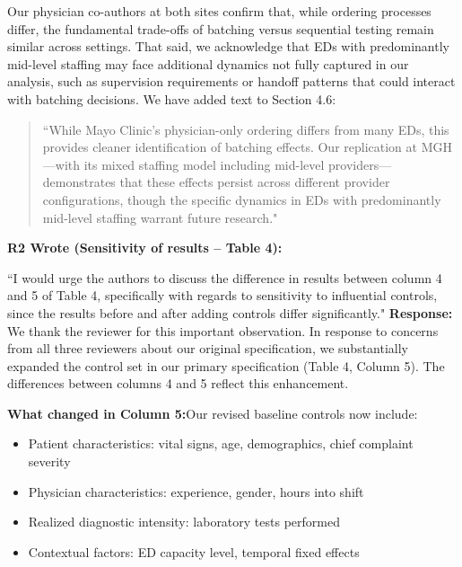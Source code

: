 \documentclass[11pt]{article}
\newenvironment{quote2}
{ \bigskip
\noindent
         \small\em
         \baselineskip=14pt
}
\newcommand{\1}{\hbox{\rm 1\kern-.35em 1}}
\begin{document}
Our physician co-authors at both sites confirm that, while ordering processes differ, the fundamental trade-offs of batching versus sequential testing remain similar across settings. That said, we acknowledge that EDs with predominantly mid-level staffing may face additional dynamics not fully captured in our analysis, such as supervision requirements or handoff patterns that could interact with batching decisions. We have added text to Section 4.6:

\begin{quote}
``While Mayo Clinic's physician-only ordering differs from many EDs, this provides cleaner identification of batching effects. Our replication at MGH—with its mixed staffing model including mid-level providers—demonstrates that these effects persist across different provider configurations, though the specific dynamics in EDs with predominantly mid-level staffing warrant future research."
\end{quote}
\color{black}


\begin{quote2}
\textbf{R2 Wrote (Sensitivity of results – Table 4):}  

\noindent``I would urge the authors to discuss the difference in results between column 4 and 5 of Table 4, specifically with regards to sensitivity to influential controls, since the results before and after adding controls differ significantly."
\end{quote2}

\noindent\textbf{Response:}\color{blue}
We thank the reviewer for this important observation. In response to concerns from all three reviewers about our original specification, we substantially expanded the control set in our primary specification (Table 4, Column 5). The differences between columns 4 and 5 reflect this enhancement.

\textbf{What changed in Column 5:}Our revised baseline controls now include:
\begin{itemize}
\item Patient characteristics: vital signs, age, demographics, chief complaint severity
\item Physician characteristics: experience, gender, hours into shift
\item Realized diagnostic intensity: laboratory tests performed
\item Contextual factors: ED capacity level, temporal fixed effects
\end{itemize}
\end{document}
